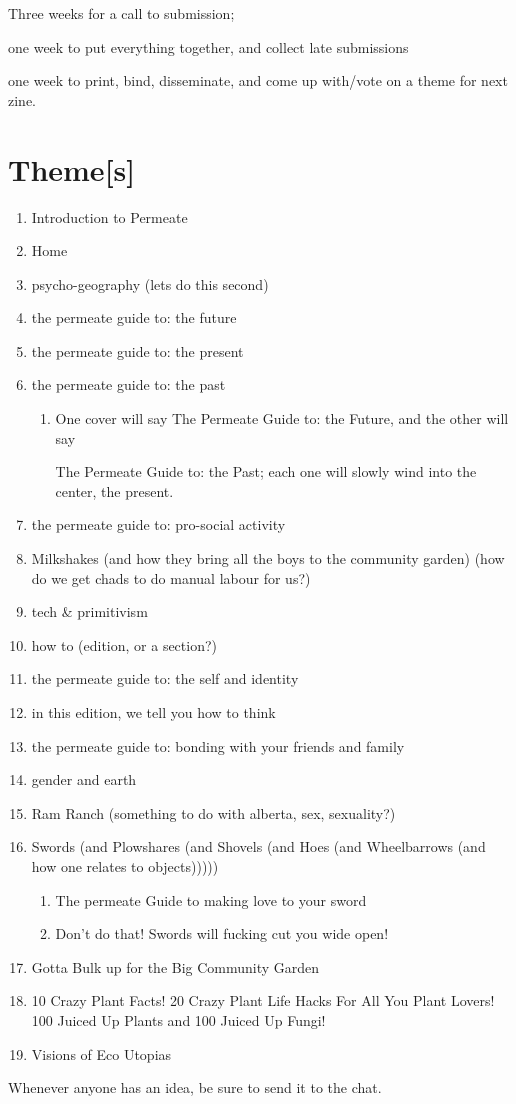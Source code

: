 	Three weeks for a call to submission; 

	one week to put everything together, and collect late submissions

	one week to print, bind, disseminate, and come up with/vote on a theme for next zine.
\section{Theme[s]}
	\begin{enumerate}
		\item Introduction to Permeate
		\item Home
		\item psycho-geography (lets do this second)
		\item the permeate guide to: the future
		\item the permeate guide to: the present
		\item the permeate guide to: the past
		\begin{enumerate}
			\item One cover will say The Permeate Guide to: the Future, and the other will say

			The Permeate Guide to: the Past; each one will slowly wind into the center, the present.
		\end{enumerate}
		\item the permeate guide to: pro-social activity
		\item Milkshakes (and how they bring all the boys to the community garden) (how do we get chads to do manual labour for us?)

		\item tech \& primitivism
		\item how to (edition, or a section?)
		\item the permeate guide to: the self and identity
		\item in this edition, we tell you how to think
		\item the permeate guide to: bonding with your friends and family
		\item gender and earth
		\item Ram Ranch (something to do with alberta, sex, sexuality?)
		\item Swords (and Plowshares (and Shovels (and Hoes (and Wheelbarrows (and how one relates to objects)))))
		\begin{enumerate}
			\item The permeate Guide to making love to your sword
			\item Don't do that! Swords will fucking cut you wide open!
		\end{enumerate}
		\item Gotta Bulk up for the Big Community Garden
		\item 10 Crazy Plant Facts! 20 Crazy Plant Life Hacks For All You Plant Lovers! 100 Juiced Up Plants and 100 Juiced Up Fungi!
		\item Visions of Eco Utopias
	\end{enumerate}
	Whenever anyone has an idea, be sure to send it to the chat. 
